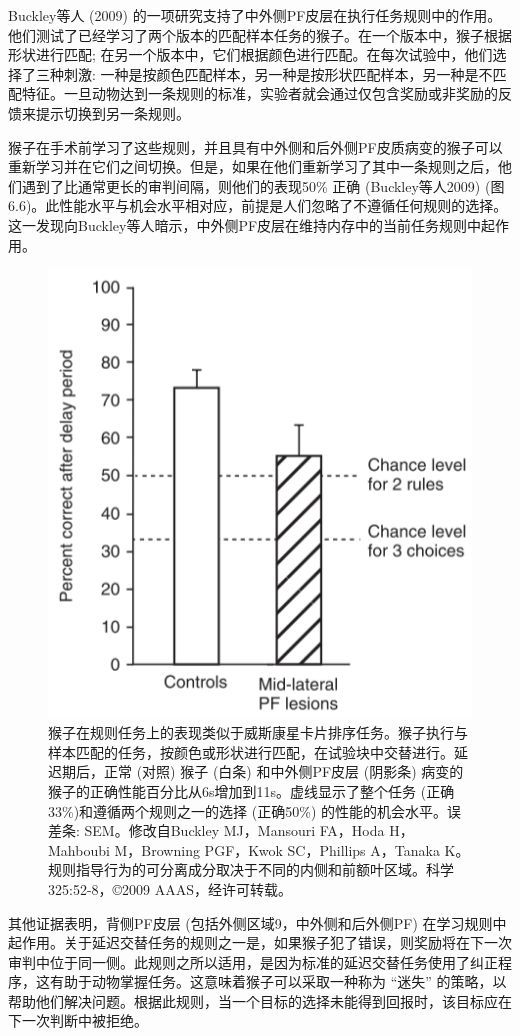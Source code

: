 Buckley等人 (2009) 的一项研究支持了中外侧PF皮层在执行任务规则中的作用。他们测试了已经学习了两个版本的匹配样本任务的猴子。在一个版本中，猴子根据形状进行匹配; 在另一个版本中，它们根据颜色进行匹配。在每次试验中，他们选择了三种刺激: 一种是按颜色匹配样本，另一种是按形状匹配样本，另一种是不匹配特征。一旦动物达到一条规则的标准，实验者就会通过仅包含奖励或非奖励的反馈来提示切换到另一条规则。

猴子在手术前学习了这些规则，并且具有中外侧和后外侧PF皮质病变的猴子可以重新学习并在它们之间切换。但是，如果在他们重新学习了其中一条规则之后，他们遇到了比通常更长的审判间隔，则他们的表现50\% 正确 (Buckley等人2009) (图6.6)。此性能水平与机会水平相对应，前提是人们忽略了不遵循任何规则的选择。这一发现向Buckley等人暗示，中外侧PF皮层在维持内存中的当前任务规则中起作用。
\begin{figure}
	\centering
	\includegraphics[width=0.5\linewidth]{image_pfc/Fig_6_6}
	\caption{猴子在规则任务上的表现类似于威斯康星卡片排序任务。猴子执行与样本匹配的任务，按颜色或形状进行匹配，在试验块中交替进行。延迟期后，正常 (对照) 猴子 (白条) 和中外侧PF皮层 (阴影条) 病变的猴子的正确性能百分比从6s增加到11s。虚线显示了整个任务 (正确33\%)和遵循两个规则之一的选择 (正确50\%) 的性能的机会水平。误差条: SEM。修改自Buckley MJ，Mansouri FA，Hoda H，Mahboubi M，Browning PGF，Kwok SC，Phillips A，Tanaka K。规则指导行为的可分离成分取决于不同的内侧和前额叶区域。科学325:52-8，©2009 AAAS，经许可转载。}
	\label{fig:fig}
\end{figure}
其他证据表明，背侧PF皮层 (包括外侧区域9，中外侧和后外侧PF) 在学习规则中起作用。关于延迟交替任务的规则之一是，如果猴子犯了错误，则奖励将在下一次审判中位于同一侧。此规则之所以适用，是因为标准的延迟交替任务使用了纠正程序，这有助于动物掌握任务。这意味着猴子可以采取一种称为 “迷失” 的策略，以帮助他们解决问题。根据此规则，当一个目标的选择未能得到回报时，该目标应在下一次判断中被拒绝。

